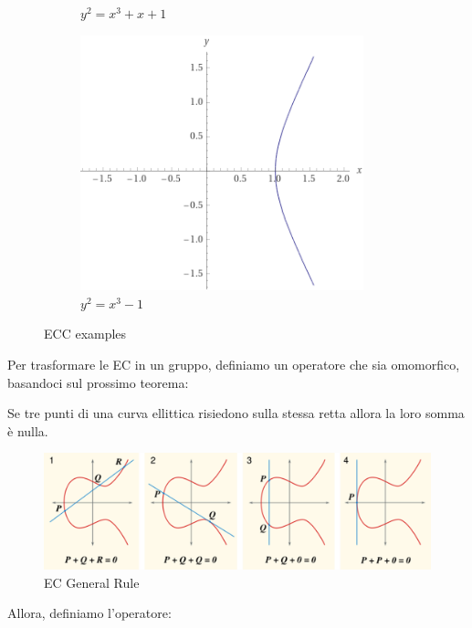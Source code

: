 \begin{figure}[h]
\begin{subfigure}[b]{0.3\textwidth}
         \caption{$y^2=x^3+x+1$}
         \label{fig:ec2}
     \end{subfigure}
     \hfill
        \begin{subfigure}[b]{0.3\textwidth}
         \centering
         \includegraphics[width=0.9\textwidth]{image/ecc/ec3.png}
         \caption{$y^2=x^3-1$}
         \label{fig:ec3}
     \end{subfigure}
        \caption{ECC examples}
        \label{fig:ecc}
\end{figure}
Per trasformare le EC in un gruppo, definiamo un operatore che sia omomorfico, basandoci sul prossimo teorema:\pagebreak
\begin{theorem}\label{thm:ecrule}
Se tre punti di una curva ellittica risiedono sulla stessa retta allora la loro somma è nulla.
\end{theorem}
\begin{figure}[h]
    \centering
    \includegraphics{image/ecc/ecrule.png}
    \caption{EC General Rule}
    \label{fig:ecrule}
\end{figure}
Allora, definiamo l'operatore:
